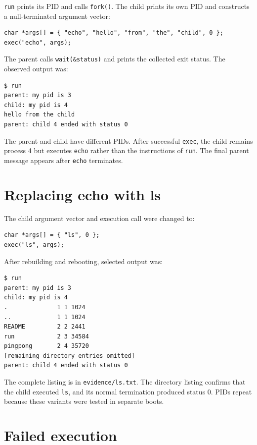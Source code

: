 \documentclass{../latex/utmreport}
\begin{document}
\texttt{run} prints its PID and calls \texttt{fork()}. The child prints
its own PID and constructs a null-terminated argument vector:

\begin{lstlisting}
char *args[] = { "echo", "hello", "from", "the", "child", 0 };
exec("echo", args);
\end{lstlisting}

The parent calls \texttt{wait(\&status)} and prints the collected exit
status. The observed output was:

\begin{lstlisting}
$ run
parent: my pid is 3
child: my pid is 4
hello from the child
parent: child 4 ended with status 0
\end{lstlisting}

The parent and child have different PIDs. After successful
\texttt{exec}, the child remains process 4 but executes \texttt{echo}
rather than the instructions of \texttt{run}. The final parent message
appears after \texttt{echo} terminates.

\section{Replacing echo with ls}\label{replacing-echo-with-ls}

The child argument vector and execution call were changed to:

\begin{lstlisting}
char *args[] = { "ls", 0 };
exec("ls", args);
\end{lstlisting}

After rebuilding and rebooting, selected output was:

\begin{lstlisting}
$ run
parent: my pid is 3
child: my pid is 4
.              1 1 1024
..             1 1 1024
README         2 2 2441
run            2 3 34584
pingpong       2 4 35720
[remaining directory entries omitted]
parent: child 4 ended with status 0
\end{lstlisting}

The complete listing is in \texttt{evidence/ls.txt}. The directory
listing confirms that the child executed \texttt{ls}, and its normal
termination produced status 0. PIDs repeat because these variants were
tested in separate boots.

\newpage
\section{Failed execution}\label{failed-execution}
\end{document}
